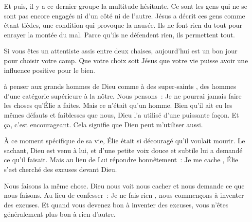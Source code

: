 
Et puis, il y a ce dernier groupe \ocadr la multitude hésitante.
 Ce sont les gens qui ne se sont pas encore engagés
 ni d'un côté ni de l'autre. Jésus a décrit ces gens comme étant tièdes,
 une condition qui provoque la nausée.
 Ils ne font rien du tout pour enrayer la montée du mal.
 Parce qu'ils ne défendent rien, ils permettent tout. 

Si vous êtes un attentiste assis entre deux chaises,
 aujourd'hui est un bon jour pour choisir votre camp.
 Que votre choix soit Jésus
 \ocadr que votre vie puisse avoir une influence positive pour le bien. 

\dvrule






 à penser aux grands hommes de Dieu
 comme à des \og super-saints \fg{},
 des hommes d'une catégorie supérieure à la nôtre. Nous pensons~:
 \og Je ne pourrai jamais faire les choses qu'Élie a faites. \fg{}
 Mais ce n'était qu'un homme. Bien qu'il ait eu les mêmes défauts
 et faiblesses que nous, Dieu l'a utilisé d'une puissante façon.
 Et ça, c'est encourageant. Cela signifie que Dieu peut m'utiliser aussi.

\`A ce moment spécifique de sa vie, Élie était si découragé
 qu'il voulait mourir. Le sachant, Dieu est venu à lui,
 et d'une petite voix douce et subtile lui a demandé ce qu'il faisait.
 Mais au lieu de Lui répondre honnêtement~: \og Je me cache \fg{},
 Élie s'est cherché des excuses devant Dieu. 

Nous faisons la même chose. Dieu nous voit nous cacher
 et nous demande ce que nous faisons.
 Au lieu de confesser~: \og Je ne fais rien \fg{},
 nous commençons à inventer des excuses.
 Et quand vous devenez bon à inventer des excuses,
 vous n'êtes généralement plus bon à rien d'autre. 

